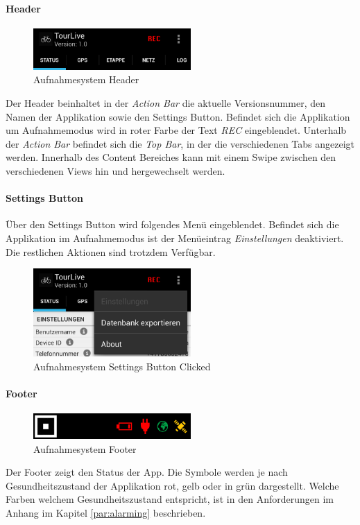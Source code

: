 \paragraph{Header}
\begin{figure}[H]
	\centering
	\includegraphics[width=60mm]{images/android/header.png}
	\caption{Aufnahmesystem Header}
\end{figure}
Der Header beinhaltet in der \textit{Action Bar} die aktuelle Versionsnummer, den Namen der Applikation sowie den Settings Button. Befindet sich die Applikation um Aufnahmemodus wird in roter Farbe der Text \textit{REC} eingeblendet. Unterhalb der \textit{Action Bar} befindet sich die \textit{Top Bar}, in der die verschiedenen Tabs angezeigt werden. Innerhalb des Content Bereiches kann mit einem Swipe zwischen den verschiedenen Views  hin und hergewechselt werden.

\paragraph{Settings Button}
Über den Settings Button wird folgendes Menü eingeblendet. Befindet sich die Applikation im Aufnahmemodus ist der Menüeintrag \textit{Einstellungen} deaktiviert. Die restlichen Aktionen sind trotzdem Verfügbar.

\begin{figure}[H]
	\centering
	\includegraphics[width=60mm]{images/android/settingsclicked.png}
	\caption{Aufnahmesystem Settings Button Clicked}
\end{figure}



\paragraph{Footer}
\begin{figure}[H]
	\centering
	\includegraphics[width=60mm]{images/android/footer.png}
	\caption{Aufnahmesystem Footer}
\end{figure}
Der Footer zeigt den Status der App. Die Symbole werden je nach Gesundheitszustand der Applikation rot, gelb oder in grün dargestellt. Welche Farben welchem Gesundheitszustand entspricht, ist in den Anforderungen im Anhang im Kapitel \ref{par:alarming} beschrieben.\\

